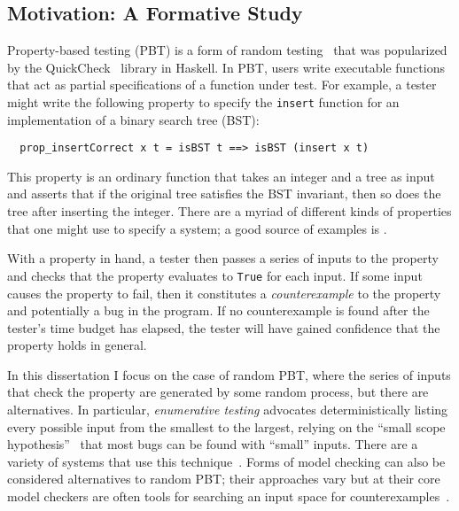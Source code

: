 \subsection{Motivation: A Formative Study }

%
%
Property-based testing (PBT) is a form of random testing~\cite{hamlet1994random}
that was popularized by the QuickCheck~\cite{DBLP:conf/icfp/ClaessenH00} library
in Haskell. In PBT, users write executable functions that act as partial
specifications of a function under test. For example, a tester might write the
following property to specify the \lstinline{insert} function for an
implementation of a binary search tree (BST):
\begin{lstlisting}
  prop_insertCorrect x t = isBST t ==> isBST (insert x t)
\end{lstlisting}
This property is an ordinary function that takes an integer and a tree as input
and asserts that if the original tree satisfies the BST invariant, then so does
the tree after inserting the integer. There are a myriad of different kinds of
properties that one might use to specify a system; a good source of examples is
\citet{HowToSpecifyIt}.

With a property in hand, a tester then passes a series of inputs to the property
and checks that the property evaluates to \lstinline{True} for each input.  If
some input causes the property to fail, then it constitutes a {\em
counterexample} to the property and potentially a bug in the program. If no
counterexample is found after the tester's time budget has elapsed, the tester
will have gained confidence that the property holds in general.

In this dissertation I focus on the case of random PBT, where the series of
inputs that check the property are generated by some random process, but there
are alternatives. In particular, {\em enumerative testing} advocates
deterministically listing every possible input from the smallest to the largest,
relying on the ``small scope hypothesis''~\cite{jackson1996elements} that most
bugs can be found with ``small'' inputs. There are a variety of systems that use
this technique~\cite{DBLP:conf/haskell/RuncimanNL08,leancheck}. Forms of model
checking can also be considered alternatives to random PBT; their approaches
vary but at their core model checkers are often tools for searching an input
space for counterexamples~\cite{biere2009bounded}.

